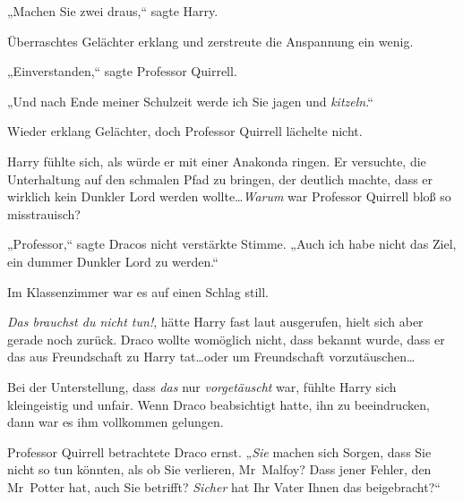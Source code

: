 „Machen Sie zwei draus,“ sagte Harry.

Überraschtes Gelächter erklang und zerstreute die Anspannung ein wenig.

„Einverstanden,“ sagte Professor Quirrell.

„Und nach Ende meiner Schulzeit werde ich Sie jagen und \emph{kitzeln}.“

Wieder erklang Gelächter, doch Professor Quirrell lächelte nicht.

Harry fühlte sich, als würde er mit einer Anakonda ringen. Er versuchte, die Unterhaltung auf den schmalen Pfad zu bringen, der deutlich machte, dass er wirklich kein Dunkler Lord werden wollte…\emph{Warum} war Professor Quirrell bloß so misstrauisch?

„Professor,“ sagte Dracos nicht verstärkte Stimme. „Auch ich habe nicht das Ziel, ein dummer Dunkler Lord zu werden.“

Im Klassenzimmer war es auf einen Schlag still.

\emph{Das brauchst du nicht tun!}, hätte Harry fast laut ausgerufen, hielt sich aber gerade noch zurück. Draco wollte womöglich nicht, dass bekannt wurde, dass er das aus Freundschaft zu Harry tat…oder um Freundschaft vorzutäuschen…

Bei der Unterstellung, dass \emph{das} nur \emph{vorgetäuscht} war, fühlte Harry sich kleingeistig und unfair. Wenn Draco beabsichtigt hatte, ihn zu beeindrucken, dann war es ihm vollkommen gelungen.

Professor Quirrell betrachtete Draco ernst. „\emph{Sie} machen sich Sorgen, dass Sie nicht so tun könnten, als ob Sie verlieren, Mr~Malfoy? Dass jener Fehler, den Mr~Potter hat, auch Sie betrifft? \emph{Sicher} hat Ihr Vater Ihnen das beigebracht?“

